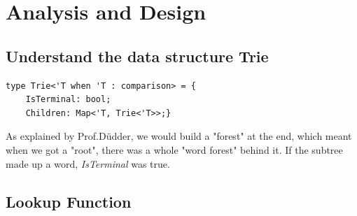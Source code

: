 \documentclass{article}
\begin{document}




\section{Analysis and Design}

\subsection{Understand the data structure Trie}
\begin{lstlisting}
type Trie<'T when 'T : comparison> = {
    IsTerminal: bool;               
    Children: Map<'T, Trie<'T>>;}
\end{lstlisting}

As explained by Prof.Düdder, we would build a "forest" at the end, which meant when we got a "root", there was a whole "word forest" behind it. If the subtree made up a word, \emph{IsTerminal} was true.

\subsection{Lookup Function}\label{sec:lookup}
\end{document}
